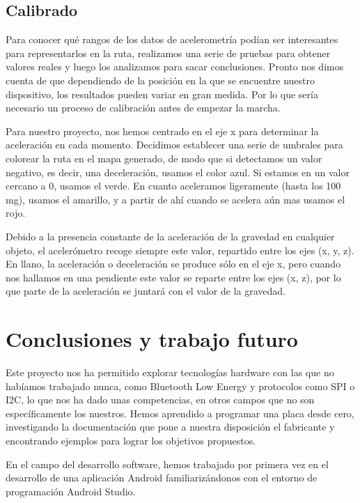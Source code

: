 
\section{Calibrado}

Para conocer qué rangos de los datos de acelerometría podían ser interesantes para representarlos en la ruta, realizamos una serie de pruebas para obtener valores reales y luego los analizamos para sacar conclusiones. Pronto nos dimos cuenta de que dependiendo de la posición en la que se encuentre nuestro dispositivo, los resultados pueden variar en gran medida. Por lo que sería necesario un proceso de calibración antes de empezar la marcha.

Para nuestro proyecto, nos hemos centrado en el eje x para determinar la aceleración en cada momento. Decidimos establecer una serie de umbrales para colorear la ruta en el mapa generado, de modo que si detectamos un valor negativo, es decir, una deceleración, usamos el color azul. Si estamos en un valor cercano a 0, usamos el verde. En cuanto aceleramos ligeramente (hasta los 100 mg), usamos el amarillo, y a partir de ahí cuando se acelera aún mas usamos el rojo.

Debido a la presencia constante de la aceleración de la gravedad en cualquier objeto, el acelerómetro recoge siempre este valor, repartido entre los ejes (x, y, z). En llano, la aceleración o deceleración se produce sólo en el eje x, pero cuando nos hallamos en una pendiente este valor se reparte entre los ejes (x, z), por lo que parte de la aceleración se juntará con el valor de la gravedad.

\cleardoublepage

\chapter{Conclusiones y trabajo futuro}
\label{makereference8}

Este proyecto nos ha permitido explorar tecnologías hardware con las que no habíamos trabajado nunca, como Bluetooth Low Energy y protocolos como SPI o I2C, lo que nos ha dado unas competencias, en otros campos que no son específicamente los nuestros. Hemos aprendido a programar una placa desde cero, investigando la documentación que pone a nuestra disposición el fabricante y encontrando ejemplos para lograr los objetivos propuestos.

En el campo del desarrollo software, hemos trabajado por primera vez en el desarrollo de una aplicación Android familiarizándonos con el entorno de programación Android Studio.

